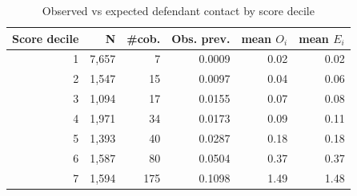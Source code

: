 \begin{table}[htbp]\centering
\caption{Observed vs expected defendant contact by score decile}
\label{tab:obs_exp_bins}
\begin{tabular}{rrrrrr}\hline
Score decile & N & \#cob. & Obs. prev. & mean $O_i$ & mean $E_i$ \\\hline
1 & 7,657 & 7 & 0.0009 & 0.02 & 0.02 \\
2 & 1,547 & 15 & 0.0097 & 0.04 & 0.06 \\
3 & 1,094 & 17 & 0.0155 & 0.07 & 0.08 \\
4 & 1,971 & 34 & 0.0173 & 0.09 & 0.11 \\
5 & 1,393 & 40 & 0.0287 & 0.18 & 0.18 \\
6 & 1,587 & 80 & 0.0504 & 0.37 & 0.37 \\
7 & 1,594 & 175 & 0.1098 & 1.49 & 1.48 \\
\hline\end{tabular}\end{table}
